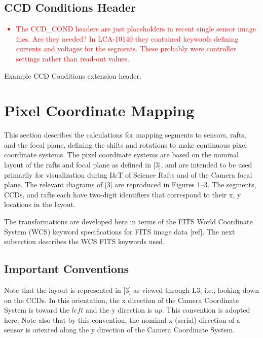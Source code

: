 \documentclass{article}[12pt]
\newcommand{\red}{\textcolor{red}}
\begin{document}
\subsection{CCD Conditions Header}

\red{
\begin{itemize}
\item{The CCD\_COND headers are just placeholders in recent single sensor image files.  Are they needed?  In LCA-10140 they contained keywords defining currents and voltages for the segments.  These probably were controller settings rather than read-out values.}
\end{itemize}
}

\begin{table}
\begin{alltt}

\end{alltt}
\caption{Example CCD Conditions extension header.\label{table:ccd_cond}}
\end{table}


\section{Pixel Coordinate Mapping\label{sec:pixelcoords}}
This section describes the calculations for mapping segments to sensors, rafts, and the focal plane, defining the shifts and rotations to make continuous pixel coordinate systems.  The pixel coordinate systems are based on the nominal layout of the rafts and focal plane as defined in [3], and are intended to be used primarily for visualization during I\&T of Science Rafts and of the Camera focal plane.  The relevant diagrams of [3] are reproduced in Figures 1--3.  The segments, CCDs, and rafts each have two-digit identifiers that correspond to their x, y locations in the layout.

The transformations are developed here in terms of the FITS World Coordinate System (WCS) keyword specifications for FITS image data [ref].  The next subsection describes the WCS FITS keywords used.




\subsection{Important Conventions}
Note that the layout is represented in [3] as viewed through L3, i.e., looking down on the CCDs.  In this orientation, the x direction of the Camera Coordinate System is toward the $left$ and the y direction is $up$.  This convention is adopted here.  Note also that by this convention, the nominal x (serial) direction of a sensor is oriented along the y direction of the Camera Coordinate System.  
\end{document}
